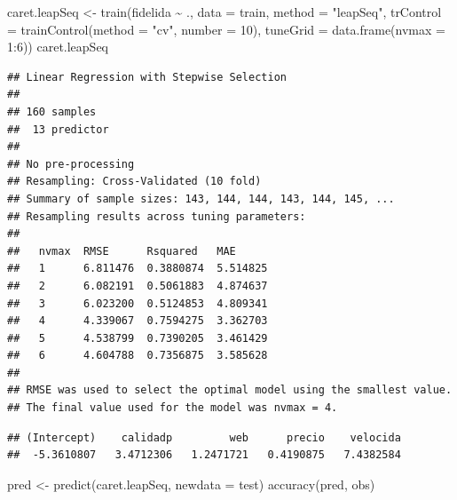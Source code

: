 \documentclass[
  spanish,
]{book}
\newenvironment{Shaded}{\begin{snugshade}}{\end{snugshade}}
\newcommand{\AttributeTok}[1]{\textcolor[rgb]{0.77,0.63,0.00}{#1}}
\newcommand{\CommentTok}[1]{\textcolor[rgb]{0.56,0.35,0.01}{\textit{#1}}}
\newcommand{\DecValTok}[1]{\textcolor[rgb]{0.00,0.00,0.81}{#1}}
\newcommand{\FunctionTok}[1]{\textcolor[rgb]{0.00,0.00,0.00}{#1}}
\newcommand{\NormalTok}[1]{#1}
\newcommand{\OtherTok}[1]{\textcolor[rgb]{0.56,0.35,0.01}{#1}}
\newcommand{\SpecialCharTok}[1]{\textcolor[rgb]{0.00,0.00,0.00}{#1}}
\newcommand{\StringTok}[1]{\textcolor[rgb]{0.31,0.60,0.02}{#1}}
\theoremstyle{break}
\theoremstyle{definition}
\theoremstyle{definition}
\theoremstyle{definition}
\theoremstyle{definition}
\theoremstyle{remark}
\begin{document}
\begin{Shaded}
\begin{Highlighting}[]
\NormalTok{caret.leapSeq }\OtherTok{\textless{}{-}} \FunctionTok{train}\NormalTok{(fidelida }\SpecialCharTok{\textasciitilde{}}\NormalTok{ ., }\AttributeTok{data =}\NormalTok{ train, }\AttributeTok{method =} \StringTok{"leapSeq"}\NormalTok{,}
                   \AttributeTok{trControl =} \FunctionTok{trainControl}\NormalTok{(}\AttributeTok{method =} \StringTok{"cv"}\NormalTok{, }\AttributeTok{number =} \DecValTok{10}\NormalTok{),}
                   \AttributeTok{tuneGrid =} \FunctionTok{data.frame}\NormalTok{(}\AttributeTok{nvmax =} \DecValTok{1}\SpecialCharTok{:}\DecValTok{6}\NormalTok{))}
\NormalTok{caret.leapSeq}
\end{Highlighting}
\end{Shaded}

\begin{verbatim}
## Linear Regression with Stepwise Selection 
## 
## 160 samples
##  13 predictor
## 
## No pre-processing
## Resampling: Cross-Validated (10 fold) 
## Summary of sample sizes: 143, 144, 144, 143, 144, 145, ... 
## Resampling results across tuning parameters:
## 
##   nvmax  RMSE      Rsquared   MAE     
##   1      6.811476  0.3880874  5.514825
##   2      6.082191  0.5061883  4.874637
##   3      6.023200  0.5124853  4.809341
##   4      4.339067  0.7594275  3.362703
##   5      4.538799  0.7390205  3.461429
##   6      4.604788  0.7356875  3.585628
## 
## RMSE was used to select the optimal model using the smallest value.
## The final value used for the model was nvmax = 4.
\end{verbatim}

\begin{Shaded}
\end{Shaded}

\begin{verbatim}
## (Intercept)    calidadp         web      precio    velocida 
##  -5.3610807   3.4712306   1.2471721   0.4190875   7.4382584
\end{verbatim}

\begin{Shaded}
\begin{Highlighting}[]
\NormalTok{pred }\OtherTok{\textless{}{-}} \FunctionTok{predict}\NormalTok{(caret.leapSeq, }\AttributeTok{newdata =}\NormalTok{ test)}
\FunctionTok{accuracy}\NormalTok{(pred, obs)}
\end{Highlighting}
\end{Shaded}
\end{document}

